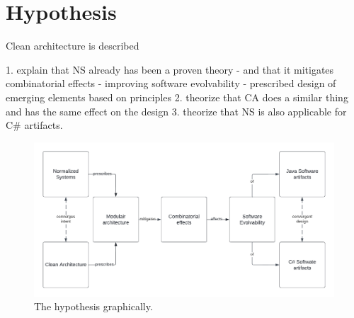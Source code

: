 \section{Hypothesis} \label{hypothesis} 

Clean architecture is described 

1. explain that NS already has been a proven theory
    - and that it mitigates combinatorial effects
    - improving software evolvability
    - prescribed design of emerging elements based on principles
2. theorize that CA does a similar thing and has the same effect on the design
3. theorize that NS is also applicable for C\# artifacts.

\begin{figure}[!h]
    \centering
    \includegraphics[width=1\textwidth]{Figures/hypothesis.pdf}
    \caption[The hypothesis graphically.]{The hypothesis graphically.}
    \label{fig:hypothesis}
\end{figure}